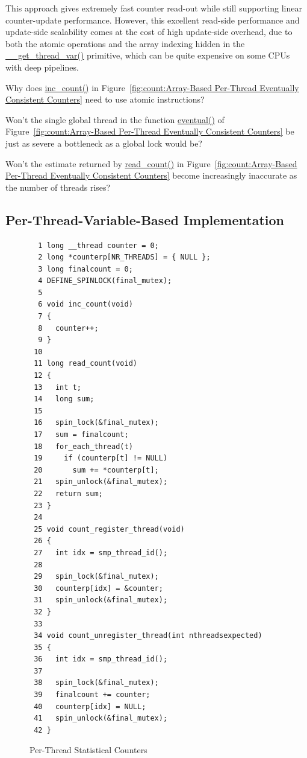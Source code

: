 This approach gives extremely fast counter read-out while still
supporting linear counter-update performance.
However, this excellent read-side performance and update-side scalability
comes at the cost of high update-side overhead, due to both the
atomic operations and the array indexing hidden in the
\url{__get_thread_var()} primitive, which can be quite expensive
on some CPUs with deep pipelines.

\QuickQuiz{}
	Why does \url{inc_count()} in
	Figure~\ref{fig:count:Array-Based Per-Thread Eventually Consistent Counters}
	need to use atomic instructions?
 \QuickQuizEnd

\QuickQuiz{}
	Won't the single global thread in the function \url{eventual()} of
	Figure~\ref{fig:count:Array-Based Per-Thread Eventually Consistent Counters}
	be just as severe a bottleneck as a global lock would be?
 \QuickQuizEnd

\QuickQuiz{}
	Won't the estimate returned by \url{read_count()} in
	Figure~\ref{fig:count:Array-Based Per-Thread Eventually Consistent Counters}
	become increasingly
	inaccurate as the number of threads rises?
 \QuickQuizEnd

\subsection{Per-Thread-Variable-Based Implementation}
\label{sec:count:Per-Thread-Variable-Based Implementation}

\begin{figure}[tbp]
{ \scriptsize
\begin{verbatim}
  1 long __thread counter = 0;
  2 long *counterp[NR_THREADS] = { NULL };
  3 long finalcount = 0;
  4 DEFINE_SPINLOCK(final_mutex);
  5 
  6 void inc_count(void)
  7 {
  8   counter++;
  9 }
 10 
 11 long read_count(void)
 12 {
 13   int t;
 14   long sum;
 15 
 16   spin_lock(&final_mutex);
 17   sum = finalcount;
 18   for_each_thread(t)
 19     if (counterp[t] != NULL)
 20       sum += *counterp[t];
 21   spin_unlock(&final_mutex);
 22   return sum;
 23 }
 24 
 25 void count_register_thread(void)
 26 {
 27   int idx = smp_thread_id();
 28 
 29   spin_lock(&final_mutex);
 30   counterp[idx] = &counter;
 31   spin_unlock(&final_mutex);
 32 }
 33 
 34 void count_unregister_thread(int nthreadsexpected)
 35 {
 36   int idx = smp_thread_id();
 37 
 38   spin_lock(&final_mutex);
 39   finalcount += counter;
 40   counterp[idx] = NULL;
 41   spin_unlock(&final_mutex);
 42 }
\end{verbatim}
}
\caption{Per-Thread Statistical Counters}
\label{fig:count:Per-Thread Statistical Counters}
\end{figure}

